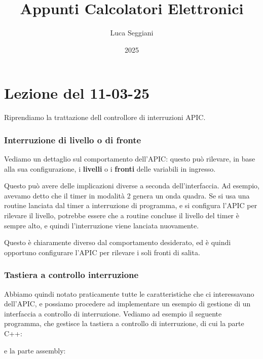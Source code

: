 \documentclass[a4paper,11pt]{article}
\title{Appunti Calcolatori Elettronici}
\author{Luca Seggiani}
\date{2025}
\begin{document}
\section{Lezione del 11-03-25}

\thispagestyle{empty}
\pagestyle{fancy}

Riprendiamo la trattazione dell controllore di interruzioni APIC.

\subsubsection{Interruzione di livello o di fronte}
Vediamo un dettaglio sul comportamento dell'APIC: questo può rilevare, in base alla sua configurazione, i \textbf{livelli} o i \textbf{fronti} delle variabili in ingresso.

Questo può avere delle implicazioni diverse a seconda dell'interfaccia.
Ad esempio, avevamo detto che il timer in modalità 2 genera un onda quadra.
Se si usa una routine lanciata dal timer a interruzione di programma, e si configura l'APIC per rilevare il livello, potrebbe essere che a routine concluse il livello del timer è sempre alto, e quindi l'interruzione viene lanciata nuovamente.

Questo è chiaramente diverso dal comportamento desiderato, ed è quindi opportuno configurare l'APIC per rilevare i soli fronti di salita.

\subsubsection{Tastiera a controllo interruzione}

Abbiamo quindi notato praticamente tutte le caratteristiche che ci interessavano dell'APIC, e possiamo procedere ad implementare un esempio di gestione di un interfaccia a controllo di interruzione.
Vediamo ad esempio il seguente programma, che gestisce la tastiera a controllo di interruzione, di cui la parte C++:
\lstset{style=codestyle, language=C++}

e la parte assembly:
\lstset{style=codestyle, language=assembler}

\end{document}

